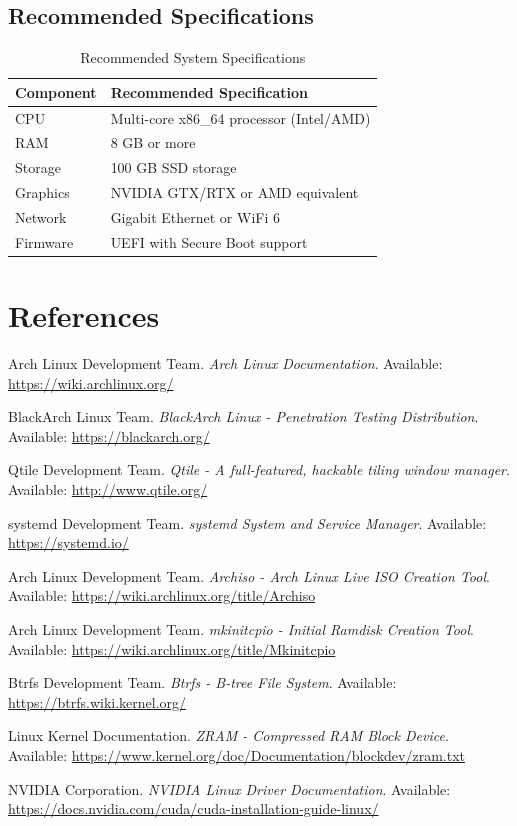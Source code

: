 \documentclass[12pt,a4paper]{article}
\begin{document}
\subsection{Recommended Specifications}
\begin{table}[H]
\centering
\begin{tabular}{@{}ll@{}}
\toprule
\textbf{Component} & \textbf{Recommended Specification} \\
\midrule
CPU & Multi-core x86\_64 processor (Intel/AMD) \\
RAM & 8 GB or more \\
Storage & 100 GB SSD storage \\
Graphics & NVIDIA GTX/RTX or AMD equivalent \\
Network & Gigabit Ethernet or WiFi 6 \\
Firmware & UEFI with Secure Boot support \\
\bottomrule
\end{tabular}
\caption{Recommended System Specifications}
\end{table}

\section{References}

\begin{thebibliography}{9}

Arch Linux Development Team.
\textit{Arch Linux Documentation}.
Available: \url{https://wiki.archlinux.org/}

BlackArch Linux Team.
\textit{BlackArch Linux - Penetration Testing Distribution}.
Available: \url{https://blackarch.org/}

Qtile Development Team.
\textit{Qtile - A full-featured, hackable tiling window manager}.
Available: \url{http://www.qtile.org/}

systemd Development Team.
\textit{systemd System and Service Manager}.
Available: \url{https://systemd.io/}

Arch Linux Development Team.
\textit{Archiso - Arch Linux Live ISO Creation Tool}.
Available: \url{https://wiki.archlinux.org/title/Archiso}

Arch Linux Development Team.
\textit{mkinitcpio - Initial Ramdisk Creation Tool}.
Available: \url{https://wiki.archlinux.org/title/Mkinitcpio}

Btrfs Development Team.
\textit{Btrfs - B-tree File System}.
Available: \url{https://btrfs.wiki.kernel.org/}

Linux Kernel Documentation.
\textit{ZRAM - Compressed RAM Block Device}.
Available: \url{https://www.kernel.org/doc/Documentation/blockdev/zram.txt}

NVIDIA Corporation.
\textit{NVIDIA Linux Driver Documentation}.
Available: \url{https://docs.nvidia.com/cuda/cuda-installation-guide-linux/}

\end{thebibliography}
\end{document}
